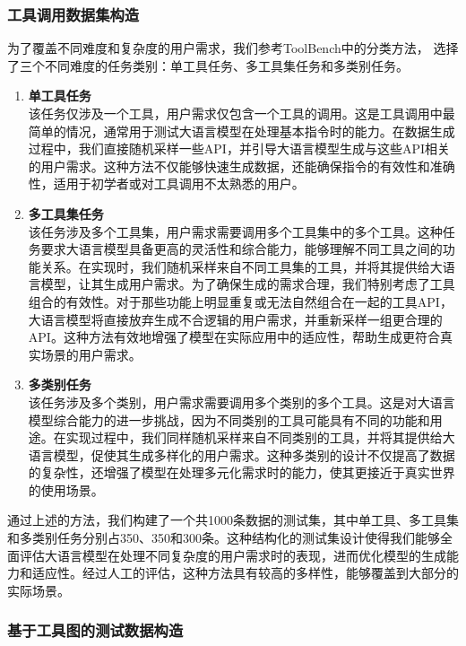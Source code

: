 \subsubsection{工具调用数据集构造}

为了覆盖不同难度和复杂度的用户需求，我们参考ToolBench中的分类方法，
选择了三个不同难度的任务类别：单工具任务、多工具集任务和多类别任务。

\begin{enumerate}
  \item \textbf{单工具任务} \\
    该任务仅涉及一个工具，用户需求仅包含一个工具的调用。这是工具调用中最简单的情况，通常用于测试大语言模型在处理基本指令时的能力。在数据生成过程中，我们直接随机采样一些API，并引导大语言模型生成与这些API相关的用户需求。这种方法不仅能够快速生成数据，还能确保指令的有效性和准确性，适用于初学者或对工具调用不太熟悉的用户。

  \item \textbf{多工具集任务} \\
    该任务涉及多个工具集，用户需求需要调用多个工具集中的多个工具。这种任务要求大语言模型具备更高的灵活性和综合能力，能够理解不同工具之间的功能关系。在实现时，我们随机采样来自不同工具集的工具，并将其提供给大语言模型，让其生成用户需求。为了确保生成的需求合理，我们特别考虑了工具组合的有效性。对于那些功能上明显重复或无法自然组合在一起的工具API，大语言模型将直接放弃生成不合逻辑的用户需求，并重新采样一组更合理的API。这种方法有效地增强了模型在实际应用中的适应性，帮助生成更符合真实场景的用户需求。

  \item \textbf{多类别任务} \\
    该任务涉及多个类别，用户需求需要调用多个类别的多个工具。这是对大语言模型综合能力的进一步挑战，因为不同类别的工具可能具有不同的功能和用途。在实现过程中，我们同样随机采样来自不同类别的工具，并将其提供给大语言模型，促使其生成多样化的用户需求。这种多类别的设计不仅提高了数据的复杂性，还增强了模型在处理多元化需求时的能力，使其更接近于真实世界的使用场景。

\end{enumerate}

通过上述的方法，我们构建了一个共1000条数据的测试集，其中单工具、多工具集和多类别任务分别占350、350和300条。这种结构化的测试集设计使得我们能够全面评估大语言模型在处理不同复杂度的用户需求时的表现，进而优化模型的生成能力和适应性。经过人工的评估，这种方法具有较高的多样性，能够覆盖到大部分的实际场景。

\subsubsection{基于工具图的测试数据构造}

